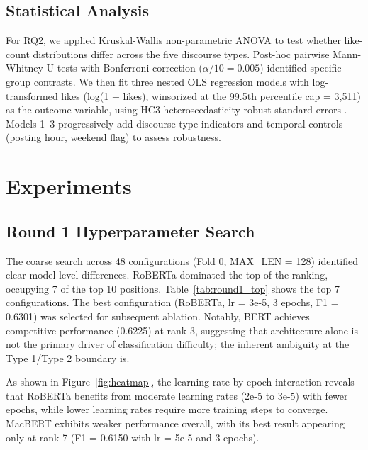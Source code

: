\documentclass[letterpaper]{article}
\begin{document}
\subsection{Statistical Analysis}
For RQ2, we applied Kruskal-Wallis non-parametric ANOVA to test whether like-count distributions differ across the five discourse types. Post-hoc pairwise Mann-Whitney U tests with Bonferroni correction ($\alpha/10 = 0.005$) identified specific group contrasts. We then fit three nested OLS regression models with log-transformed likes (log(1 + likes), winsorized at the 99.5th percentile cap = 3,511) as the outcome variable, using HC3 heteroscedasticity-robust standard errors \citep{bail2018}. Models 1--3 progressively add discourse-type indicators and temporal controls (posting hour, weekend flag) to assess robustness.

\section{Experiments}

\subsection{Round 1 Hyperparameter Search}
The coarse search across 48 configurations (Fold 0, MAX\_LEN = 128) identified clear model-level differences. RoBERTa dominated the top of the ranking, occupying 7 of the top 10 positions. Table~\ref{tab:round1_top} shows the top 7 configurations. The best configuration (RoBERTa, lr = 3e-5, 3 epochs, F1 = 0.6301) was selected for subsequent ablation. Notably, BERT achieves competitive performance (0.6225) at rank 3, suggesting that architecture alone is not the primary driver of classification difficulty; the inherent ambiguity at the Type 1/Type 2 boundary is.

As shown in Figure~\ref{fig:heatmap}, the learning-rate-by-epoch interaction reveals that RoBERTa benefits from moderate learning rates (2e-5 to 3e-5) with fewer epochs, while lower learning rates require more training steps to converge. MacBERT exhibits weaker performance overall, with its best result appearing only at rank 7 (F1 = 0.6150 with lr = 5e-5 and 3 epochs).
\end{document}

